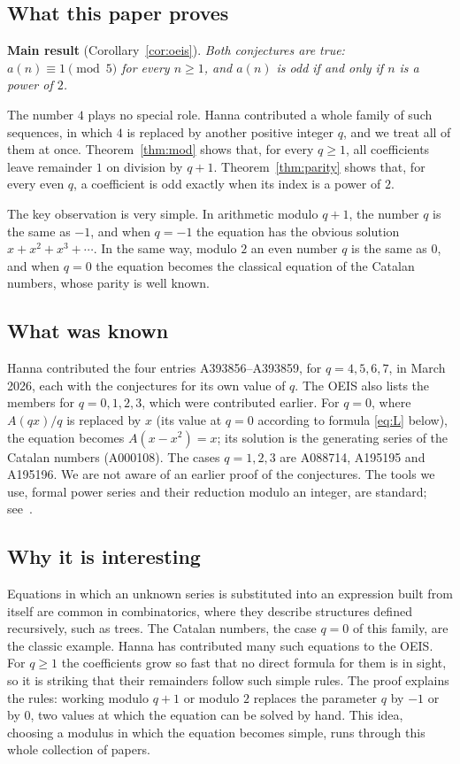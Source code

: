 \documentclass[11pt,a4paper]{article}
\theoremstyle{definition}
\theoremstyle{remark}
\begin{document}
\subsection{What this paper proves}
\textbf{Main result} (Corollary~\ref{cor:oeis}). \emph{Both conjectures are true: $a(n)\equiv1\pmod{5}$ for every $n\ge1$, and $a(n)$ is odd if and only if $n$ is a power of $2$.}

The number $4$ plays no special role. Hanna contributed a whole family of such sequences, in which
$4$ is replaced by another positive integer $q$, and we treat all of them at once.
Theorem~\ref{thm:mod} shows that, for every $q\ge1$, all coefficients leave remainder $1$ on division by $q+1$.
Theorem~\ref{thm:parity} shows that, for every even $q$, a coefficient is odd exactly when its index is a power of $2$.

The key observation is very simple. In arithmetic modulo $q+1$, the number $q$ is the same as $-1$, and when $q=-1$ the
equation has the obvious solution $x+x^2+x^3+\cdots$. In the same way, modulo $2$ an even number $q$ is the same as $0$,
and when $q=0$ the equation becomes the classical equation of the Catalan numbers, whose parity is well known.

\subsection{What was known}
Hanna contributed the four entries A393856--A393859, for $q=4,5,6,7$, in March 2026, each with the conjectures for its
own value of $q$. The OEIS also lists the members for $q=0,1,2,3$, which were contributed earlier. For $q=0$, where
$A(qx)/q$ is replaced by $x$ (its value at $q=0$ according to formula \eqref{eq:L} below), the equation becomes
$A(x-x^2)=x$; its solution is the generating series of the Catalan numbers (A000108). The cases $q=1,2,3$ are
A088714, A195195 and A195196. We are not aware of an earlier proof of the conjectures. The tools we use, formal power
series and their reduction modulo an integer, are standard; see~\cite{niven,stanley}.

\subsection{Why it is interesting}
Equations in which an unknown series is substituted into an expression built from itself are common in
combinatorics, where they describe structures defined recursively, such as trees. The Catalan numbers, the case $q=0$
of this family, are the classic example. Hanna has contributed many such equations to the OEIS. For $q\ge1$ the
coefficients grow so fast that no direct formula for them is in sight, so it is striking that their remainders follow
such simple rules. The proof explains the rules: working modulo $q+1$ or modulo $2$ replaces the parameter $q$ by $-1$
or by $0$, two values at which the equation can be solved by hand. This idea, choosing a modulus in which the equation
becomes simple, runs through this whole collection of papers.
\end{document}
